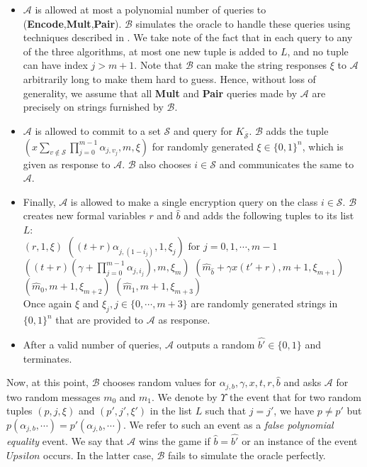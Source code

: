 \begin{itemize}
\item $\mathcal{A}$ is allowed at most a polynomial number of queries to (\textbf{Encode},\textbf{Mult},\textbf{Pair}). $\mathcal{B}$ simulates the oracle to handle these queries using techniques described in \cite{boneh2014low}. We take note of the fact that in each query to any of the three algorithms, at most one new tuple is added to $L$, and no tuple can have index $j>m+1$. Note that $\mathcal{B}$ can make the string responses $\xi$ to $\mathcal{A}$ arbitrarily long to make them hard to guess. Hence, without loss of generality, we assume that all \textbf{Mult} and \textbf{Pair} queries made by $\mathcal{A}$ are precisely on strings furnished by $\mathcal{B}$.\\

\item $\mathcal{A}$ is allowed to commit to a set $\mathcal{S}$ and query for $K_{\overline{\mathcal{S}}}$. $\mathcal{B}$ adds the tuple $\left(x\sum_{v\notin\mathcal{S}}{\prod_{j=0}^{m-1}\alpha_{j,v_j}},m,\xi\right)$ for randomly generated $\xi\in\{0,1\}^{n}$, which is given as response to $\mathcal{A}$. $\mathcal{B}$ also chooses $i\in\mathcal{S}$ and communicates the same to $\mathcal{A}$.\\ 

\item Finally, $\mathcal{A}$ is allowed to make a single encryption query on the class $i\in\mathcal{S}$. $\mathcal{B}$ creates new formal variables $r$ and $\hat{b}$ and adds the following tuples to its list $L$:\\

 \subitem $(r,1,\xi)$
 \subitem $((t+r)\alpha_{j,\left(1-i_{j}\right)},1,\xi_{j}) \text{ for } j=0,1,\cdots,m-1$
 \subitem $((t+r)(\gamma+\prod_{j=0}^{m-1}\alpha_{j,i_j}),m,\xi_{m})$
 \subitem $(\hat{m}_{\hat{b}}+\gamma x(t'+r),m+1,\xi_{m+1})$
 \subitem $(\hat{m}_0,m+1,\xi_{m+2})$
 \subitem $(\hat{m}_1,m+1,\xi_{m+3})$\\

\noindent Once again $\xi$ and $\xi_j, j\in\{0,\cdots,m+3\}$ are randomly generated strings in $\{0,1\}^{n}$ that are provided to $\mathcal{A}$ as response.\\

\item After a valid number of queries, $\mathcal{A}$ outputs a random $\hat{b'}\in\{0,1\}$ and terminates.
\end{itemize}

\noindent Now, at this point, $\mathcal{B}$ chooses random values for $\alpha_{j,b},\gamma,x,t,r,\hat{b}$ and asks $\mathcal{A}$ for two random messages $m_0$ and $m_1$. We denote by $\Upsilon$ the event that for two random tuples $(p,j,\xi)$ and $(p',j',\xi')$ in the list $L$ such that $j=j'$, we have $p\neq p'$ but $p(\alpha_{j,b},\cdots)=p'(\alpha_{j,b},\cdots)$. We refer to such an event as a \emph{false polynomial equality} event. We say that $\mathcal{A}$ wins the game if $\hat{b}=\hat{b'}$ or an instance of the event $Upsilon$ occurs. In the latter case, $\mathcal{B}$ fails to simulate the oracle perfectly.

